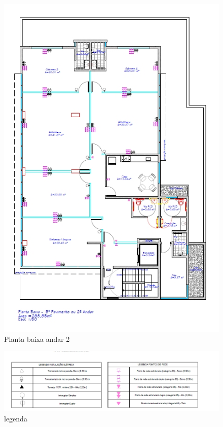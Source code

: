 \documentclass[	DIV=calc,%
							paper=a4,%
							fontsize=12pt,%
							onecolumn]{scrartcl}	 					%
\begin{document}
\begin{figure}
	\centering
	\includegraphics[width=\textwidth]{fig3}
	\caption{Planta baixa andar 2}
	\label{fig3}
\end{figure}

\begin{figure}
	\centering
	\includegraphics[width=\textwidth]{leg}
	\caption{legenda}
	\label{leg}
\end{figure}
\end{document}

